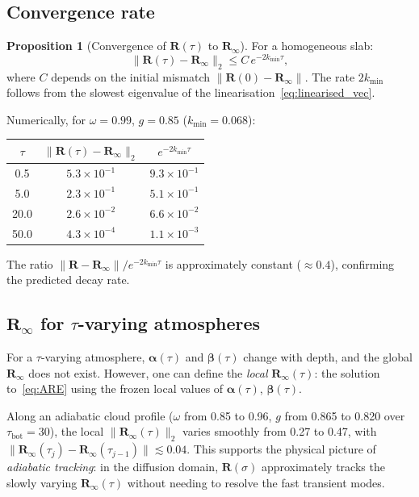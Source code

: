 \documentclass[11pt,a4paper]{article}
\newcommand{\mat}[1]{\mathbf{#1}}
\newcommand{\tbot}{\tau_{\mathrm{bot}}}
\newcommand{\kmin}{k_{\min}}
\newcommand{\Rinf}{\mat{R}_\infty}
\theoremstyle{definition}
\newtheorem{proposition}{Proposition}
\begin{document}
\subsection{Convergence rate}

\begin{proposition}[Convergence of $\mat{R}(\tau)$ to $\Rinf$]
\label{prop:convergence_R_inf}
For a homogeneous slab:
\begin{equation}
  \|\mat{R}(\tau) - \Rinf\|_2 \leq C\,e^{-2\kmin\tau},
\end{equation}
where $C$ depends on the initial mismatch $\|\mat{R}(0)-\Rinf\|$.
The rate $2\kmin$ follows from the slowest eigenvalue of the
linearisation~\eqref{eq:linearised_vec}.
\end{proposition}

Numerically, for $\omega=0.99$, $g=0.85$ ($\kmin=0.068$):
\begin{center}
\begin{tabular}{ccc}
\toprule
$\tau$ & $\|\mat{R}(\tau)-\Rinf\|_2$ & $e^{-2\kmin\tau}$ \\
\midrule
0.5  & $5.3\times 10^{-1}$ & $9.3\times 10^{-1}$ \\
5.0  & $2.3\times 10^{-1}$ & $5.1\times 10^{-1}$ \\
20.0 & $2.6\times 10^{-2}$ & $6.6\times 10^{-2}$ \\
50.0 & $4.3\times 10^{-4}$ & $1.1\times 10^{-3}$ \\
\bottomrule
\end{tabular}
\end{center}
The ratio $\|\mat{R}-\Rinf\|/e^{-2\kmin\tau}$ is approximately
constant (${\approx}0.4$), confirming the predicted decay rate.

\subsection{$\Rinf$ for $\tau$-varying atmospheres}

For a $\tau$-varying atmosphere, $\mat{\alpha}(\tau)$ and
$\mat{\beta}(\tau)$ change with depth, and the global $\Rinf$ does not
exist.  However, one can define the \emph{local} $\Rinf(\tau)$: the
solution to~\eqref{eq:ARE} using the frozen local values of
$\mat{\alpha}(\tau)$, $\mat{\beta}(\tau)$.

Along an adiabatic cloud profile ($\omega$ from 0.85 to 0.96, $g$ from
0.865 to 0.820 over $\tbot=30$), the local $\|\Rinf(\tau)\|_2$
varies smoothly from 0.27 to 0.47, with
$\|\Rinf(\tau_j)-\Rinf(\tau_{j-1})\|\lesssim 0.04$.  This
supports the physical picture of \emph{adiabatic tracking}: in the
diffusion domain, $\mat{R}(\sigma)$ approximately tracks the slowly
varying $\Rinf(\tau)$ without needing to resolve the fast transient
modes.
\end{document}
